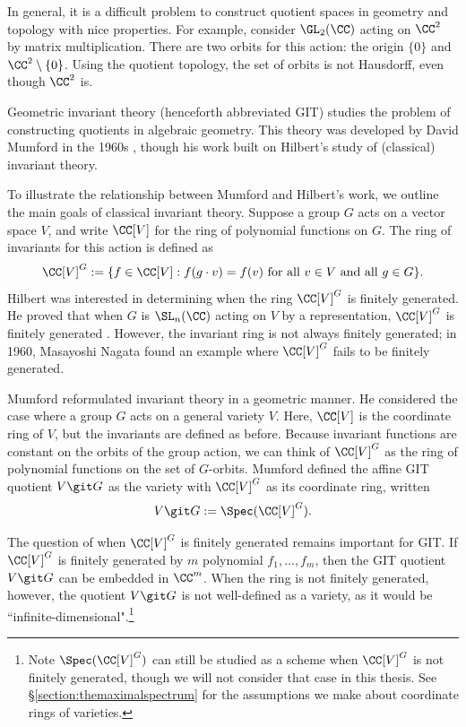 \documentclass[12pt]{amsart}
\theoremstyle{plain}
\theoremstyle{definition}
\begin{document}
In general, it is a difficult problem to construct quotient spaces in geometry and topology with nice properties.
For example, consider $\GL_2(\CC)$ acting on $\CC^2$ by matrix multiplication.
There are two orbits for this action: the origin $\{0\}$ and $\CC^2\setminus\{0\}$.
Using the quotient topology, the set of orbits is not Hausdorff, even though $\CC^2$ is.

Geometric invariant theory (henceforth abbreviated GIT) studies the problem of constructing quotients in algebraic geometry.
This theory was developed by David Mumford in the 1960s \cite{Mumford65}, though his work built on Hilbert's study of (classical) invariant theory.

To illustrate the relationship between Mumford and Hilbert's work, we outline the main goals of classical invariant theory.
Suppose a group $G$ acts on a vector space $V$, and write $\CC[V]$ for the ring of polynomial functions on $G$.
The ring of invariants for this action is defined as
$$\CC[V]^G := \{f \in \CC[V] : f(g \cdot v) = f(v) \text{ for all } v \in V \text{ and all } g \in G\}.$$
Hilbert was interested in determining when the ring $\CC[V]^G$ is finitely generated.
He proved that when $G$ is $\SL_n(\CC)$ acting on $V$ by a representation, $\CC[V]^G$ is finitely generated \cite{Hilbert90}.
However, the invariant ring is not always finitely generated; in 1960, Masayoshi Nagata found an example where $\CC[V]^G$ fails to be finitely generated.

Mumford reformulated invariant theory in a geometric manner.
He considered the case where a group $G$ acts on a general variety $V$.
Here, $\CC[V]$ is the coordinate ring of $V$, but the invariants are defined as before.
Because invariant functions are constant on the orbits of the group action, we can think of $\CC[V]^G$ as the ring of polynomial functions on the set of $G$-orbits.
Mumford defined the affine GIT quotient $V \git G$ as the variety with $\CC[V]^G$ as its coordinate ring, written
$$V \git G := \Spec(\CC[V]^G).$$

The question of when $\CC[V]^G$ is finitely generated remains important for GIT.
If $\CC[V]^G$ is finitely generated by $m$ polynomial $f_1, \ldots, f_m$, then the GIT quotient $V \git G$ can be embedded in $\CC^m$.
When the ring is not finitely generated, however, the quotient $V \git G$ is not well-defined as a variety, as it would be ``infinite-dimensional".\footnote{Note $\Spec(\CC[V]^G)$ can still be studied as a scheme when $\CC[V]^G$ is not finitely generated, though we will not consider that case in this thesis. See \S \ref{section:themaximalspectrum} for the assumptions we make about coordinate rings of varieties.}
\end{document}
